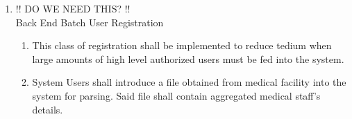 \begin{enumerate}
\begin{enumerate}
		\item{!! DO WE NEED THIS? !!\\Back End Batch User Registration}
		\begin{enumerate}
			\item This class of registration shall be implemented to reduce tedium when large amounts of high level authorized users must be fed into the system.
			\item System Users shall introduce a file obtained from medical facility into the system for parsing. Said file shall contain aggregated medical staff's details.
		\end{enumerate}
	\end{enumerate}
\end{enumerate}